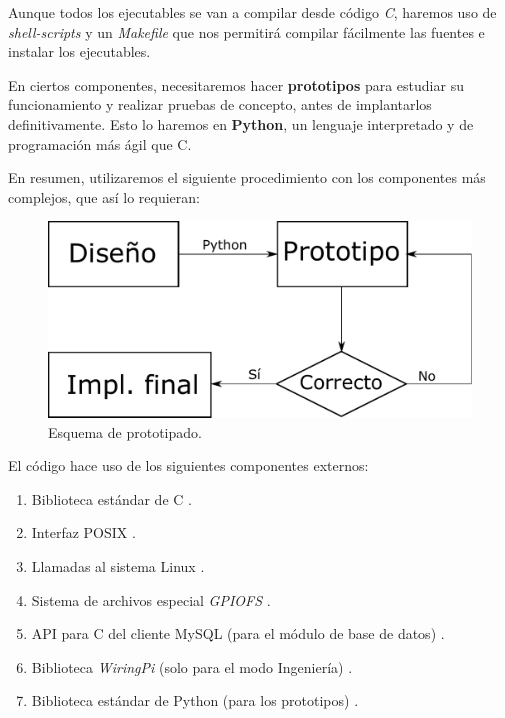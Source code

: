 Aunque todos los ejecutables se van a compilar desde código \textit{C}, haremos uso de \textit{shell-scripts} y un \textit{Makefile} que nos permitirá compilar fácilmente las fuentes e instalar los ejecutables.

En ciertos componentes, necesitaremos hacer \textbf{prototipos} para estudiar su funcionamiento y realizar pruebas de concepto, antes de implantarlos definitivamente. Esto lo haremos en \textbf{Python}, un lenguaje interpretado y de programación más ágil que C.

En resumen, utilizaremos el siguiente procedimiento con los componentes más complejos, que así lo requieran:

\smallskip

\begin{figure}[H]
	\noindent \begin{centering}
		\includegraphics[width=\linewidth/2]{capitulo5/prototipado}
		\par\end{centering}
	\smallskip
	\caption{\label{fig:prototipado} Esquema de prototipado.}
\end{figure} 

\smallskip

El código hace uso de los siguientes componentes externos:

\begin{enumerate}
	\item Biblioteca estándar de C \cite{cplusplus}.
	\item Interfaz \acrshort{POSIX} \cite{wiki_posix}.
	\item Llamadas al sistema Linux \cite{manpages}.
	\item Sistema de archivos especial \textit{GPIOFS} \cite{gpiofs}.
	\item \acrshort{API} para C del cliente MySQL (para el módulo de base de datos) \cite{mysql}.
	\item Biblioteca \textit{WiringPi} (solo para el modo Ingeniería) \cite{wiringpi}.
	\item Biblioteca estándar de Python (para los prototipos) \cite{python}.
\end{enumerate}

